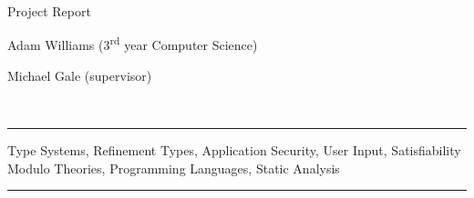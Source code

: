 \documentclass[a4paper,openany,12pt]{book}
\begin{document}
\begin{titlepage}
{}
    
    {\par}
    \vspace{1.25cm}
    \vspace{3.5cm}
    {\hspace{0.75cm}\Huge \warwickfont Project Report}
    \vspace{0.16cm}
    {\par}
    {\hspace{0.75cm}\large \warwickfont Adam Williams (3\textsuperscript{rd} year Computer Science)}


    {\hspace{0.75cm}\large \warwickfont Michael Gale (supervisor)}
    \vfill
\end{titlepage}
\restoregeometry
\restorepagecolor

\pagebreak[5]
\newenvironment{abstract}{\centering{\normalfont\Large\sffamily\color{id7-aubergine}Abstract}\vspace{0.3cm}\\
	\hfill\begin{minipage}{0.95\textwidth}
		\rule{\textwidth}{1pt}}
	{\par\noindent\rule{\textwidth}{1pt}\end{minipage}}

\newenvironment{keywords}{\centering{\normalfont\Large\sffamily\color{id7-aubergine}Keywords}\vspace{0.3cm}\\
    \hfill\begin{minipage}{0.95\textwidth}
        \rule{\textwidth}{1pt}}
    {\par\noindent\rule{\textwidth}{1pt}\end{minipage}}

\tableofcontents
\pagebreak[5]
\begin{keywords}
    Type Systems, Refinement Types, Application Security, User Input, Satisfiability Modulo Theories, Programming Languages, Static Analysis
\end{keywords}
\end{document}
